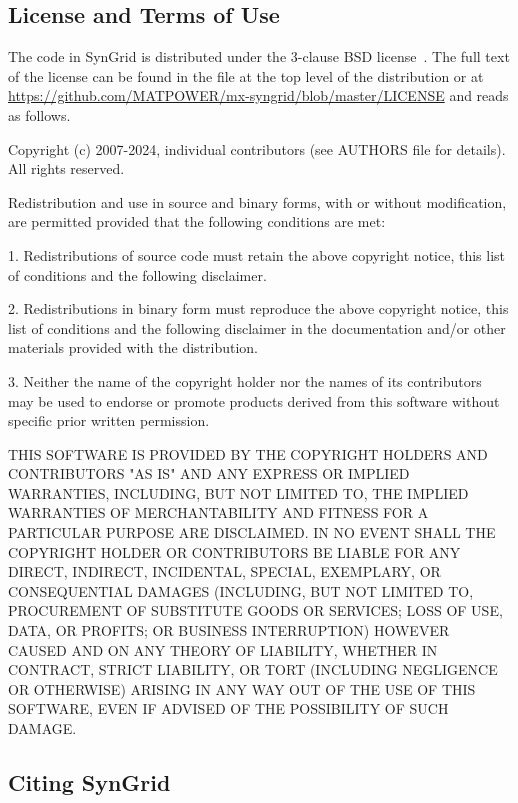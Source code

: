 \documentclass[12pt]{article}
\newcommand{\syngrid}[0]{{SynGrid}}
\newcommand{\code}[1]{{\relsize{-0.5}{\tt{{#1}}}}}  %
\numberwithin{equation}{section}
\numberwithin{table}{section}
\numberwithin{figure}{section}
\begin{document}
\clearpage
\subsection{License and Terms of Use}

The code in \syngrid{} is distributed under the 3-clause BSD license~\cite{bsd}. The full text of the license can be found in the \code{LICENSE} file at the top level of the distribution or at \url{https://github.com/MATPOWER/mx-syngrid/blob/master/LICENSE} and reads as follows.

\begin{Notice}
Copyright (c) 2007-2024, individual contributors (see AUTHORS file
for details). All rights reserved.

Redistribution and use in source and binary forms, with or without
modification, are permitted provided that the following conditions
are met:

1. Redistributions of source code must retain the above copyright
notice, this list of conditions and the following disclaimer.

2. Redistributions in binary form must reproduce the above copyright
notice, this list of conditions and the following disclaimer in the
documentation and/or other materials provided with the distribution.

3. Neither the name of the copyright holder nor the names of its
contributors may be used to endorse or promote products derived from
this software without specific prior written permission.

THIS SOFTWARE IS PROVIDED BY THE COPYRIGHT HOLDERS AND CONTRIBUTORS
"AS IS" AND ANY EXPRESS OR IMPLIED WARRANTIES, INCLUDING, BUT NOT
LIMITED TO, THE IMPLIED WARRANTIES OF MERCHANTABILITY AND FITNESS
FOR A PARTICULAR PURPOSE ARE DISCLAIMED. IN NO EVENT SHALL THE
COPYRIGHT HOLDER OR CONTRIBUTORS BE LIABLE FOR ANY DIRECT, INDIRECT,
INCIDENTAL, SPECIAL, EXEMPLARY, OR CONSEQUENTIAL DAMAGES (INCLUDING,
BUT NOT LIMITED TO, PROCUREMENT OF SUBSTITUTE GOODS OR SERVICES;
LOSS OF USE, DATA, OR PROFITS; OR BUSINESS INTERRUPTION) HOWEVER
CAUSED AND ON ANY THEORY OF LIABILITY, WHETHER IN CONTRACT, STRICT
LIABILITY, OR TORT (INCLUDING NEGLIGENCE OR OTHERWISE) ARISING IN
ANY WAY OUT OF THE USE OF THIS SOFTWARE, EVEN IF ADVISED OF THE
POSSIBILITY OF SUCH DAMAGE.
\end{Notice}

\clearpage
\subsection{Citing \syngrid{}}
\end{document}
